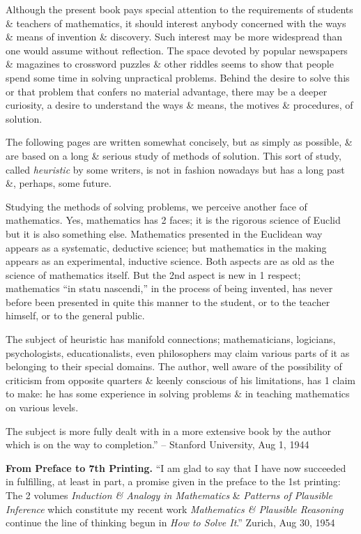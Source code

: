 \documentclass{article}
\begin{document}
\begin{enumerate}
	Although the present book pays special attention to the requirements of students \& teachers of mathematics, it should interest anybody concerned with the ways \& means of invention \& discovery. Such interest may be more widespread than one would assume without reflection. The space devoted by popular newspapers \& magazines to crossword puzzles \& other riddles seems to show that people spend some time in solving unpractical problems. Behind the desire to solve this or that problem that confers no material advantage, there may be a deeper curiosity, a desire to understand the ways \& means, the motives \& procedures, of solution.

	The following pages are written somewhat concisely, but as simply as possible, \& are based on a long \& serious study of methods of solution. This sort of study, called {\it heuristic} by some writers, is not in fashion nowadays but has a long past \&, perhaps, some future.

	Studying the methods of solving problems, we perceive another face of mathematics. Yes, mathematics has 2 faces; it is the rigorous science of {\sc Euclid} but it is also something else. Mathematics presented in the Euclidean way appears as a systematic, deductive science; but mathematics in the making appears as an experimental, inductive science. Both aspects are as old as the science of mathematics itself. But the 2nd aspect is new in 1 respect; mathematics ``in statu nascendi,'' in the process of being invented, has never before been presented in quite this manner to the student, or to the teacher himself, or to the general public.

	The subject of heuristic has manifold connections; mathematicians, logicians, psychologists, educationalists, even philosophers may claim various parts of it as belonging to their special domains. The author, well aware of the possibility of criticism from opposite quarters \& keenly conscious of his limitations, has 1 claim to make: he has some experience in solving problems \& in teaching mathematics on various levels.

	The subject is more fully dealt with in a more extensive book by the author which is on the way to completion.'' -- Stanford University, Aug 1, 1944

	{\bf From Preface to 7th Printing.} ``I am glad to say that I have now succeeded in fulfilling, at least in part, a promise given in the preface to the 1st printing: The 2 volumes {\it Induction \& Analogy in Mathematics} \& {\it Patterns of Plausible Inference} which constitute my recent work {\it Mathematics \& Plausible Reasoning} continue the line of thinking begun in {\it How to Solve It}.'' Zurich, Aug 30, 1954


\end{enumerate}
\end{document}
